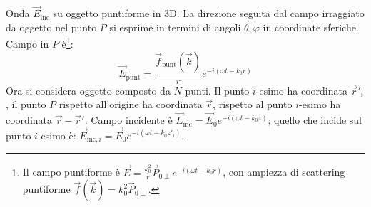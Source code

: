 \documentclass[10pt, a4paper]{scrartcl}
\numberwithin{equation}{subsection}
\theoremstyle{style1}
\begin{document}
Onda $\vec{E}_\text{inc}$ su oggetto puntiforme in 3D. La direzione seguita dal campo irraggiato da oggetto nel punto $P$ si esprime in termini di angoli $\theta , \varphi $ in coordinate sferiche. Campo in $P$ \`e\footnote{Il campo puntiforme \`e $\vec{E}= \frac{k_0^2}{r} \vec{P}_{0\perp} e^{-i(\omega t - k_0r)} $, con ampiezza di scattering puntiforme $\vec{f}(\vec{k}) = k_0^2 \vec{P}_{0\perp} $.}:
\begin{equation}
	\vec{E}_\text{punt} = \frac{\vec{f}_\text{punt}(\vec{k})}{r} e^{-i (\omega t - k_0r)} 
\end{equation}
Ora si considera oggetto composto da $N$ punti. Il punto $i$-esimo ha coordinata $\vec{r}'_i$, il punto $P$ rispetto all'origine ha coordinata $\vec{r}$, rispetto al punto $i$-esimo ha coordinata $\vec{r}-\vec{r}'$. Campo incidente \`e $\vec{E}_\text{inc}= \vec{E}_0 e^{-i(\omega  t - k_0 z)} $; quello che incide sul punto $i$-esimo \`e: $\vec{E}_{\text{inc},i} = \vec{E}_0 e^{-i(\omega t - k_0 z'_i)} $.
\end{document}

